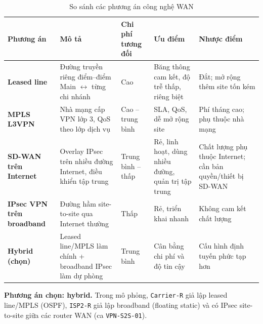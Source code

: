\begin{small}
\setlength{\tabcolsep}{3pt}
\begin{longtable}{|p{2.4cm}|p{3.0cm}|p{1.8cm}|p{3.3cm}|p{3.3cm}|}
\caption{So sánh các phương án công nghệ WAN} \label{tab:wan_options} \\
\hline
\textbf{Phương án} & \textbf{Mô tả} & \textbf{Chi phí tương đối} & \textbf{Ưu điểm} & \textbf{Nhược điểm} \\ \hline
\endhead
\textbf{Leased line} & Đường truyền riêng điểm--điểm Main $\leftrightarrow$ từng chi nhánh & Cao & Băng thông cam kết, độ trễ thấp, riêng biệt & Đắt; mở rộng thêm site tốn kém \\ \hline
\textbf{MPLS L3VPN} & Nhà mạng cấp VPN lớp 3, QoS theo lớp dịch vụ & Cao -- trung bình & SLA, QoS, dễ mở rộng site & Phí tháng cao; phụ thuộc nhà mạng \\ \hline
\textbf{SD-WAN trên Internet} & Overlay IPsec trên nhiều đường Internet, điều khiển tập trung & Trung bình -- thấp & Rẻ, linh hoạt, dùng nhiều đường, quản trị tập trung & Chất lượng phụ thuộc Internet; cần bản quyền/thiết bị SD-WAN \\ \hline
\textbf{IPsec VPN trên broadband} & Đường hầm site-to-site qua Internet thường & Thấp & Rẻ, triển khai nhanh & Không cam kết chất lượng \\ \hline
\textbf{Hybrid (chọn)} & Leased line/MPLS làm chính + broadband IPsec làm dự phòng & Trung bình & Cân bằng chi phí và độ tin cậy & Cấu hình định tuyến phức tạp hơn \\ \hline
\end{longtable}
\end{small}
\noindent \textbf{Phương án chọn: hybrid.} Trong mô phỏng, \texttt{Carrier-R} giả lập leased line/MPLS (OSPF), \texttt{ISP2-R} giả lập broadband (floating static) và có IPsec site-to-site giữa các router WAN (ca \texttt{VPN-S2S-01}).
